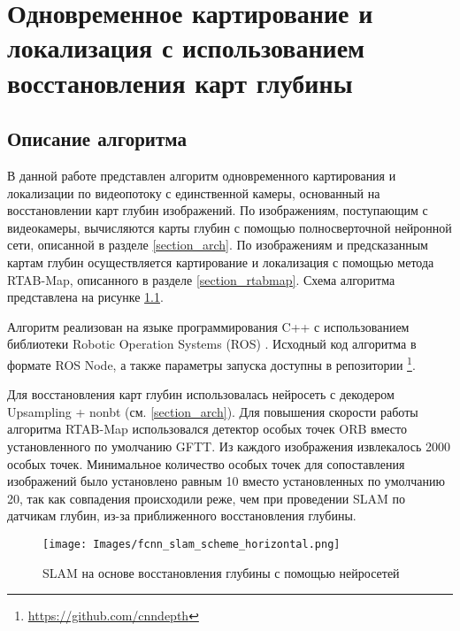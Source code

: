 \documentclass{mipt-thesis-bs}
\begin{document}

\chapter{Одновременное картирование и локализация с использованием восстановления карт глубины}

\section{Описание алгоритма}
\label{section_our_slam}

В данной работе представлен алгоритм одновременного картирования и локализации по видеопотоку с единственной камеры, основанный на восстановлении карт глубин изображений. По изображениям, поступающим с видеокамеры, вычисляются карты глубин с помощью полносверточной нейронной сети, описанной в разделе \ref{section_arch}. По изображениям и предсказанным картам глубин осуществляется картирование и локализация с помощью метода RTAB-Map, описанного в разделе \ref{section_rtabmap}. Схема алгоритма представлена на рисунке \ref{figureourslam}.

Алгоритм реализован на языке программирования C++ с использованием библиотеки Robotic Operation Systems (ROS) \cite{quigley2009ros}. Исходный код алгоритма в формате ROS Node, а также параметры запуска доступны в репозитории \footnote{\href{https://github.com/cnndepth}{https://github.com/cnndepth}}.

Для восстановления карт глубин использовалась нейросеть с декодером Upsampling + nonbt (см. \ref{section_arch}). Для повышения скорости работы алгоритма RTAB-Map использовался детектор особых точек ORB \cite{rublee2011orb} вместо установленного по умолчанию GFTT. Из каждого изображения извлекалось 2000 особых точек. Минимальное количество особых точек для сопоставления изображений было установлено равным 10 вместо установленных по умолчанию 20, так как совпадения происходили реже, чем при проведении SLAM по датчикам глубин, из-за приближенного восстановления глубины.

\begin{figure}
	\centering
	\texttt{[image: Images/fcnn\_slam\_scheme\_horizontal.png]}
	\caption{SLAM на основе восстановления глубины с помощью нейросетей}
	\label{figureourslam}
\end{figure}
\end{document}
